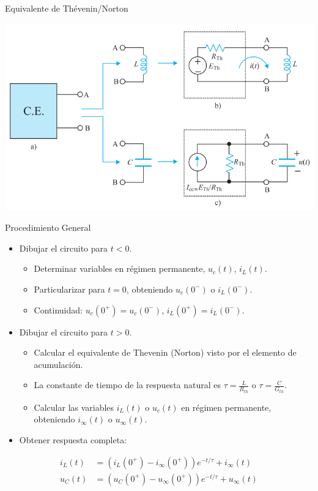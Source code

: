 \documentclass[aspectratio=169, usenames,svgnames,dvipsnames]{beamer}
\begin{document}
\begin{frame}[label={sec:org4f02c8b}]{Equivalente de Thévenin/Norton}
\begin{center}
\includegraphics[height=0.85\textheight]{../figs/Thevenin_PrimerOrden.pdf}
\end{center}
\end{frame}
\begin{frame}[label={sec:orge997171}]{Procedimiento General}
\begin{itemize}
\item Dibujar el circuito para \(t < 0\).
\begin{itemize}
\item Determinar variables en régimen permanente, \(u_c(t)\), \(i_L(t)\).
\item Particularizar para \(t = 0\), obteniendo \(u_c(0^-)\) o \(i_L(0^-)\).
\item Continuidad: \(u_c(0^+) = u_c(0^-)\), \(i_L(0^+) = i_L(0^-)\).
\end{itemize}
\item Dibujar el circuito para \(t > 0\).
\begin{itemize}
\item Calcular el equivalente de Thevenin (Norton) visto por el elemento de acumulación.
\item La constante de tiempo de la respuesta natural es \(\tau = \frac{L}{R_{th}}\) o \(\tau = \frac{C}{G_{th}}\).
\item Calcular las variables \(i_L(t)\) o \(u_c(t)\) en régimen permanente, obteniendo \(i_\infty(t)\) o \(u_\infty(t)\).
\end{itemize}
\item Obtener respuesta completa:
\end{itemize}
\begin{align*}
i_L(t) &= \left(i_L(0^+) - i_\infty(0^+)\right) e^{-t/\tau} + i_\infty(t)\\
u_C(t) &= \left(u_C(0^+) - u_\infty(0^+)\right) e^{-t/\tau} + u_\infty(t)\\
\end{align*}
\end{frame}
\end{document}
